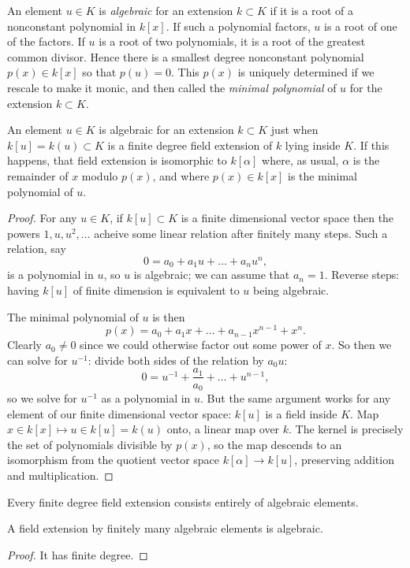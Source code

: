 An element \(u\in K\) is \emph{algebraic} for an extension \(k\subset K\) if it is a root of a nonconstant polynomial in \(k[x]\).
If such a polynomial factors, \(u\) is a root of one of the factors.
If \(u\) is a root of two polynomials, it is a root of the greatest common divisor.
Hence there is a smallest degree nonconstant polynomial \(p(x)\in k[x]\) so that \(p(u)=0\).
This \(p(x)\) is uniquely determined if we rescale to make it monic, and then called the \emph{minimal polynomial} of \(u\) for the extension \(k\subset K\).
\begin{corollary}
An element \(u\in K\) is algebraic for an extension \(k\subset K\) just when \(k[u]=k(u)\subset K\) is a finite degree field extension of \(k\) lying inside \(K\).
If this happens, that field extension is isomorphic to \(k[\alpha]\) where, as usual, \(\alpha\) is the remainder of \(x\) modulo \(p(x)\), and where \(p(x)\in k[x]\) is the minimal polynomial of \(u\).
\end{corollary}
\begin{proof}
For any \(u\in K\), if \(k[u]\subset K\) is a finite dimensional vector space then the powers \(1,u,u^2,\dots\) acheive some linear relation after finitely many steps.
Such a relation, say 
\[
0=a_0+a_1u+\dots+a_nu^n,
\] 
is a polynomial in \(u\), so \(u\) is algebraic; we can assume that \(a_n=1\).
Reverse steps: having \(k[u]\) of finite dimension is equivalent to \(u\) being algebraic.

The minimal polynomial of \(u\) is then
\[
p(x)=a_0+a_1x+\dots+a_{n-1}x^{n-1}+x^n.
\]
Clearly \(a_0\ne 0\) since we could otherwise factor out some power of \(x\).
So then we can solve for \(u^{-1}\): divide both sides of the relation by \(a_0u\):
\[
0 = u^{-1}+\frac{a_1}{a_0}+\dots+u^{n-1},
\]
so we solve for \(u^{-1}\) as a polynomial in \(u\).
But the same argument works for any element of our finite dimensional vector space: \(k[u]\) is a field inside \(K\).
Map \(x\in k[x]\mapsto u\in k[u]=k(u)\) onto, a linear map over \(k\).
The kernel is precisely the set of polynomials divisible by \(p(x)\), so the map descends to an isomorphism from the quotient vector space \(k[\alpha]\to k[u]\), preserving addition and multiplication.
\end{proof}
\begin{corollary}
Every finite degree field extension consists entirely of algebraic elements.
\end{corollary}
\begin{corollary}
A field extension by finitely many algebraic elements is algebraic.
\end{corollary}
\begin{proof}
It has finite degree.
\end{proof}


